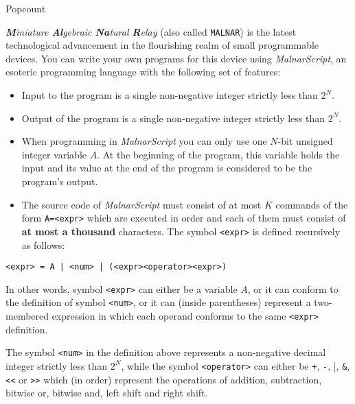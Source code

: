 \begin{statement}[
  problempoints=110,
  timelimit=1 second,
  memorylimit=512 MiB,
]{Popcount}

\textit{\textbf{M}iniature \textbf{Al}gebraic \textbf{Na}tural \textbf{R}elay}
(also called \texttt{MALNAR}) is the latest technological advancement in
the flourishing realm of small programmable devices. You can write
your own programs for this device using \textit{MalnarScript}, an esoteric
programming language with the following set of features:

\begin{itemize}[topsep=0pt]
   \item Input to the program is a single non-negative integer strictly less
         than $2^N$.
   \item Output of the program is a single non-negative integer strictly less
         than $2^N$.
   \item When programming in \textit{MalnarScript} you can only use one $N$-bit
         unsigned integer variable $A$. At the beginning of the program, this
         variable holds the input and its value at the end of the program is
         considered to be the program's output.
   \item The source code of \textit{MalnarScript} must consist of at most $K$
         commands of the form \texttt{A=<expr>} which are executed in
         order and each of them must consist of \textbf{at most a thousand}
         characters. The symbol \texttt{<expr>} is defined recursively as
         follows:
\end{itemize}

\begin{center}
  \texttt{<expr> = A | <num> | (<expr><operator><expr>)}
\end{center}

In other words, symbol \texttt{<expr>} can either be a variable $A$, or it can
conform to the definition of symbol \texttt{<num>}, or it can (inside parentheses)
represent a two-membered expression in which each operand conforms to the same
\texttt{<expr>} definition.

The symbol \texttt{<num>} in the definition above represents a non-negative
decimal integer strictly less than $2^N$, while the symbol
\verb|<operator>| can either be \verb|+|, \verb|-|, \verb|||,
\verb|&|, \verb|<<| or \verb|>>| which (in order) represent the operations
of addition, subtraction, bitwise or, bitwise and, left shift and right shift.


\end{statement}
